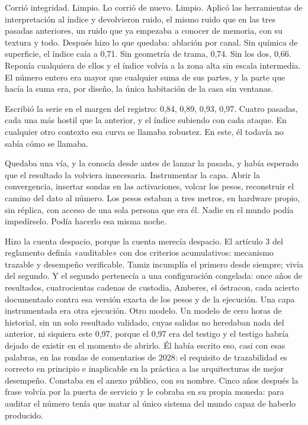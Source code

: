 Corrió integridad. Limpio. Lo corrió de nuevo. Limpio. Aplicó las herramientas de interpretación al índice y devolvieron ruido, el mismo ruido que en las tres pasadas anteriores, un ruido que ya empezaba a conocer de memoria, con su textura y todo. Después hizo lo que quedaba: ablación por canal. Sin química de superficie, el índice caía a 0,71. Sin geometría de trama, 0,74. Sin los dos, 0,66. Reponía cualquiera de ellos y el índice volvía a la zona alta sin escala intermedia. El número entero era mayor que cualquier suma de sus partes, y la parte que hacía la suma era, por diseño, la única habitación de la casa sin ventanas.

Escribió la serie en el margen del registro: 0,84, 0,89, 0,93, 0,97. Cuatro pasadas, cada una más hostil que la anterior, y el índice subiendo con cada ataque. En cualquier otro contexto esa curva se llamaba robustez. En este, él todavía no sabía cómo se llamaba.

Quedaba una vía, y la conocía desde antes de lanzar la pasada, y había esperado que el resultado la volviera innecesaria. Instrumentar la capa. Abrir la convergencia, insertar sondas en las activaciones, volcar los pesos, reconstruir el camino del dato al número. Los pesos estaban a tres metros, en hardware propio, sin réplica, con acceso de una sola persona que era él. Nadie en el mundo podía impedírselo. Podía hacerlo esa misma noche.

Hizo la cuenta despacio, porque la cuenta merecía despacio. El artículo 3 del reglamento definía «auditable» con dos criterios acumulativos: mecanismo trazable y desempeño verificable. Tamiz incumplía el primero desde siempre; vivía del segundo. Y el segundo pertenecía a una configuración congelada: once años de resultados, cuatrocientas cadenas de custodia, Amberes, el óstracon, cada acierto documentado contra esa versión exacta de los pesos y de la ejecución. Una capa instrumentada era otra ejecución. Otro modelo. Un modelo de cero horas de historial, sin un solo resultado validado, cuyas salidas no heredaban nada del anterior, ni siquiera este 0,97, porque el 0,97 era del testigo y el testigo habría dejado de existir en el momento de abrirlo. Él había escrito eso, casi con esas palabras, en las rondas de comentarios de 2028: el requisito de trazabilidad es correcto en principio e inaplicable en la práctica a las arquitecturas de mejor desempeño. Constaba en el anexo público, con su nombre. Cinco años después la frase volvía por la puerta de servicio y le cobraba en su propia moneda: para auditar el número tenía que matar al único sistema del mundo capaz de haberlo producido.

